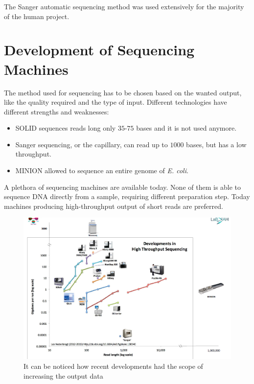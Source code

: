    The Sanger automatic sequencing method was used extensively for the majority of the human project.

\section{Development of Sequencing Machines}
The method used for sequencing has to be chosen based on the wanted output, like the quality required and the type of input.
Different technologies have different strengths and weaknesses:

\begin{multicols}{2}
    \begin{itemize}
        \item SOLID sequences reads long only $35$-$75$ bases and it is not used anymore.
        \item Sanger sequencing, or the capillary, can read up to $1000$ bases, but has a low throughput.
        \item MINION allowed to sequence an entire genome of \textit{E. coli}.
    \end{itemize}
\end{multicols}

A plethora of sequencing machines are available today.
None of them is able to sequence DNA directly from a sample, requiring different preparation step.
Today machines producing high-throughput output of short reads are preferred.

\begin{figure}[H]
\centering
\includegraphics[width=1\textwidth]{sequencingMachines}
\caption{It can be noticed how recent developments had the scope of increasing the output data}
\label{}
\end{figure}

